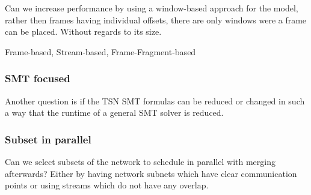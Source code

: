 \documentclass[conference]{IEEEtran}
\begin{document}
Can we increase performance by using a window-based approach for the model, rather then frames having individual offsets, there are only windows were a frame can be placed. Without regards to its size.

Frame-based, Stream-based, Frame-Fragment-based

\subsubsection{SMT focused}
Another question is if the TSN SMT formulas can be reduced or changed in such a way that the runtime of a general SMT solver is reduced.

\subsubsection{Subset in parallel}
Can we select subsets of the network to schedule in parallel with merging afterwards? Either by having network subnets which have clear communication points or using streams which do not have any overlap.



\end{document}
